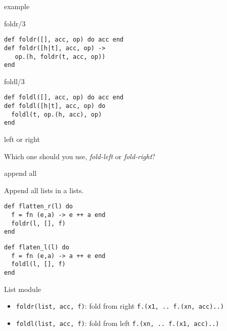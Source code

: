 \begin{frame}[fragile]{example}
     \begin{block}{foldr/3}
       \begin{verbatim}
def foldr([], acc, op) do acc end
def foldr([h|t], acc, op) ->
   op.(h, foldr(t, acc, op))
end
       \end{verbatim}
     \end{block}
\pause
     \begin{block}{foldl/3}
       \begin{verbatim}
def foldl([], acc, op) do acc end
def foldl([h|t], acc, op) do
  foldl(t, op.(h, acc), op)
end
       \end{verbatim}
     \end{block}
\end{frame}


\begin{frame}{left or right}

Which one should you use, {\em fold-left} or {\em fold-right}?

\end{frame}

\begin{frame}[fragile]{append all}

\pause Append all lists in a lists.

\vspace{20pt}

\begin{verbatim}
def flatten_r(l) do
  f = fn (e,a) -> e ++ a end
  foldr(l, [], f)
end
\end{verbatim}
\pause
\begin{verbatim}
def flaten_l(l) do
  f = fn (e,a) -> a ++ e end
  foldl(l, [], f)
end
\end{verbatim}

\end{frame}


\begin{frame}{List module}

\begin{itemize}
\item {\tt foldr(list, acc, f)}: fold from right  {\tt f.(x1, .. f.(xn, acc)..) }
\item {\tt foldl(list, acc, f)}: fold from left  {\tt f.(xn, .. f.(x1, acc)..) }
\end{itemize}

\end{frame}

